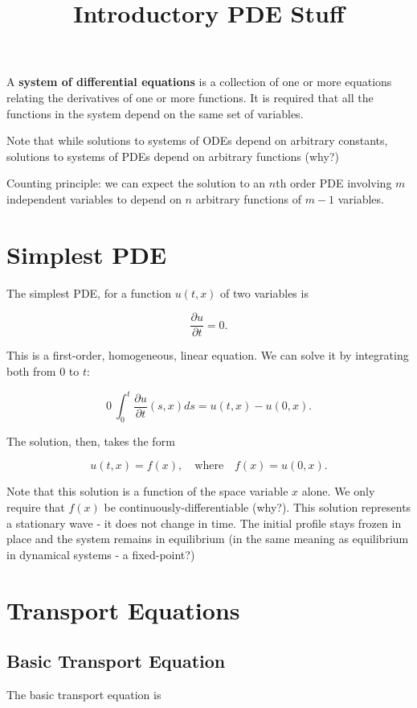 \documentclass{article}
\title{Introductory PDE Stuff}
\begin{document}
\begin{definition}
A \textbf{system of differential equations} is a collection of one or more equations relating the derivatives of one or more functions. It is required that all the functions in the system depend on the same set of variables.
\end{definition}

Note that while solutions to systems of ODEs depend on arbitrary constants, solutions to systems of PDEs depend on arbitrary functions (why?)

Counting principle: we can expect the solution to an $n$th order PDE involving $m$ independent variables to depend on $n$ arbitrary functions of $m-1$ variables.

\section{Simplest PDE}

The simplest PDE, for a function $u(t,x)$ of two variables is

\[ \frac{\partial u}{\partial t} = 0. \]

This is a first-order, homogeneous, linear equation. We can solve it by integrating both from $0$ to $t:$

\[ 0 \ \int_{0}^{t} \frac{\partial u}{\partial t} (s,x) ds = u(t,x) - u(0,x). \]

The solution, then, takes the form

\[ u(t,x) = f(x), \quad \text{where} \quad f(x) = u(0,x). \]

Note that this solution is a function of the space variable $x$ alone. We only require that $f(x)$ be \@{continuously-differentiable} (why?). This solution represents a stationary wave - it does not change in time. The initial profile stays frozen in place and the system remains in \@{equilibrium} (in the same meaning as equilibrium in dynamical systems - a \@{fixed-point}?)

\section{Transport Equations}

\subsection{Basic Transport Equation}

The basic transport equation is
\end{document}
